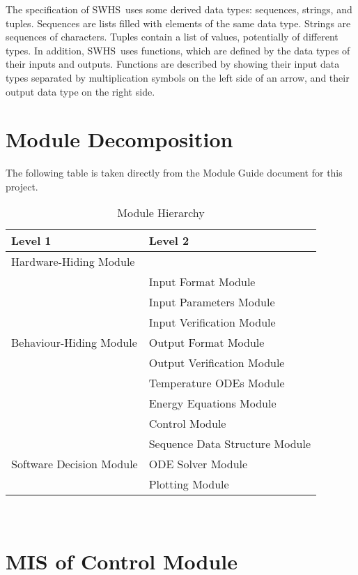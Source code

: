 \documentclass[12pt]{article}
\newcommand{\progname}{SWHS}
\begin{document}
\noindent
The specification of \progname \ uses some derived data types: sequences, strings, and
tuples. Sequences are lists filled with elements of the same data type. Strings
are sequences of characters. Tuples contain a list of values, potentially of
different types. In addition, \progname \ uses functions, which
are defined by the data types of their inputs and outputs. Functions are
described by showing their input data types separated by multiplication symbols
on the left side of an arrow, and their output data type on the right side.

\section{Module Decomposition}

The following table is taken directly from the Module Guide document for this project.

\begin{table}[!h]
	\centering
	\begin{tabular}{p{} p{}}
		\toprule
		\textbf{Level 1} & \textbf{Level 2}\\
		\midrule
		
		{Hardware-Hiding Module} & ~ \\
		\midrule
		
		\multirow{7}{0.3\textwidth}{Behaviour-Hiding Module} & Input Format Module\\
		& Input Parameters Module\\
		& Input Verification Module\\
		& Output Format Module\\
		& Output Verification Module\\
		& Temperature ODEs Module\\
		& Energy Equations Module\\ 
		& Control Module\\
		\midrule
		
		\multirow{3}{0.3\textwidth}{Software Decision Module} & {Sequence Data Structure Module}\\
		& ODE Solver Module\\
		& Plotting Module\\
		\bottomrule
		
	\end{tabular}
	\caption{Module Hierarchy}
	\label{TblMH}
\end{table}

\newpage
~\newpage
\section{MIS of Control Module} \label{Main}
\end{document}
